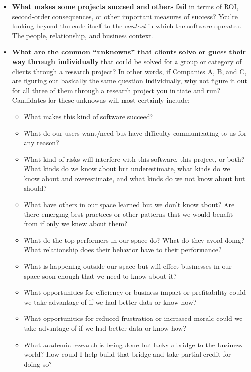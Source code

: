 \begin{itemize}
\item \textbf{What makes some projects succeed and others fail} in terms of ROI, second-order consequences, or other important measures of success? You're looking beyond the code itself to the \emph{context} in which the software operates. The people, relationship, and business context.
\item \textbf{What are the common ``unknowns'' that clients solve or guess their way through individually} that could be solved for a group or category of clients through a research project? In other words, if Companies A, B, and C, are figuring out basically the same question individually, why not figure it out for all three of them through a research project you initiate and run? Candidates for these unknowns will most certainly include:


\begin{itemize}
\item What makes this kind of software succeed?
\item What do our users want/need but have difficulty communicating to us for any reason?
\item What kind of risks will interfere with this software, this project, or both? What kinds do we know about but underestimate, what kinds do we know about and overestimate, and what kinds do we not know about but should?
\item What have others in our space learned but we don't know about? Are there emerging best practices or other patterns that we would benefit from if only we knew about them?
\item What do the top performers in our space do? What do they avoid doing? What relationship does their behavior have to their performance?
\item What is happening outside our space but will effect businesses in our space soon enough that we need to know about it?
\item What opportunities for efficiency or business impact or profitability could we take advantage of if we had better data or know-how?
\item What opportunities for reduced frustration or increased morale could we take advantage of if we had better data or know-how?
\item What academic research is being done but lacks a bridge to the business world? How could I help build that bridge and take partial credit for doing so?
\end{itemize}
\end{itemize}

